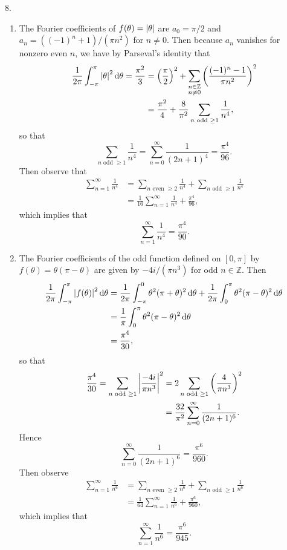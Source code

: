 \documentclass[11pt]{article}
\newcommand{\br}[1]{\left(#1\right)}
\begin{document}
8. 
\begin{enumerate}[label=(\alph*)]
    \item The Fourier coefficients of $f(\theta) = \abs{\theta}$ are $a_0 = \pi/2$ and $a_n = ((-1)^n+1)/(\pi n^2)$ for $n\neq 0$. Then because $a_n$ vanishes for nonzero even $n$, we have by Parseval's identity that
    \begin{align*}
      \frac{1}{2\pi}\int_{-\pi}^{\pi}\abs{\theta}^2\dd{\theta} = \frac{\pi^2}{3} &= \br{\frac{\pi}{2}}^2 + \sum_{\substack{n\in \mathbb{Z} \\n\neq 0}} \br{\frac{(-1)^n-1}{\pi n^2}}^2\\
      &= \frac{\pi^2}{4} + \frac{8}{\pi^2}\sum_{n \text{ odd }\geq 1 } \frac{1}{n^4},
    \end{align*} so that 
    \[\sum_{n \text{ odd }\geq 1} \frac{1}{n^4} = \sum_{n=0}^{\infty}\frac{1}{(2n+1)^4} = \frac{\pi^4}{96}.\] Then observe that
    \begin{align*}
      \sum_{n=1}^{\infty}\frac{1}{n^4} &= \sum_{n\text{ even }\geq 2 } \frac{1}{n^4} + \sum_{n \text{ odd }\geq 1} \frac{1}{n^4}\\
      &= \frac{1}{16}\sum_{n=1}^{\infty}\frac{1}{n^4} + \frac{\pi^4}{96},
    \end{align*} which implies that \[\sum_{n=1}^{\infty}\frac{1}{n^4} = \frac{\pi^4}{90}.\]
    \item The Fourier coefficients of the odd function defined on $[0,\pi]$ by $f(\theta) = \theta(\pi-\theta)$ are given by $-4i/(\pi n^3)$ for odd $n\in \mathbb{Z}$. Then 
    \begin{align*}
      \frac{1}{2\pi}\int_{-\pi}^{\pi} \abs{f(\theta)}^2\dd{\theta} &= \frac{1}{2\pi}\int_{-\pi}^{0}\theta^2(\pi+\theta)^2 \dd{\theta} + \frac{1}{2\pi}\int_{0}^{\pi}\theta^2(\pi-\theta)^2 \dd{\theta}\\
      &= \frac{1}{\pi}\int_{0}^{\pi}\theta^2(\pi-\theta)^2 \dd{\theta} \\
      &=\frac{\pi^4}{30},
    \end{align*} so that 
    \begin{align*}
      \frac{\pi^4}{30} = \sum_{n\text{ odd }\geq 1}\abs{\frac{-4i}{\pi n^3}}^2 &= 2\sum_{n\text{ odd }\geq 1}\br{\frac{4}{\pi n^3}}^2\\
      &= \frac{32}{\pi^2}\sum_{n=0}^{\infty}\frac{1}{(2n+1)^6}.
    \end{align*} Hence \[\sum_{n=0}^{\infty}\frac{1}{(2n+1)^6} = \frac{\pi^6}{960}.\]
    Then observe \begin{align*}
      \sum_{n=1}^{\infty}\frac{1}{n^6} &= \sum_{n\text{ even }\geq 2}\frac{1}{n^6} + \sum_{n\text{ odd }\geq 1}\frac{1}{n^6} \\
      &= \frac{1}{64}\sum_{n=1}^{\infty}\frac{1}{n^6} + \frac{\pi^6}{960},
    \end{align*} which implies that \[ \sum_{n=1}^{\infty}\frac{1}{n^6} = \frac{\pi^6}{945}.\]
\end{enumerate}
\end{document}
